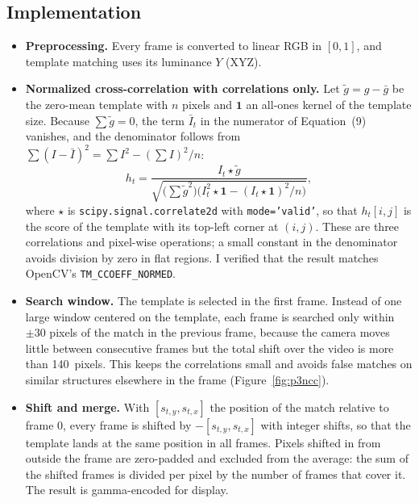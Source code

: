 \documentclass[11pt]{article}
\begin{document}
\subsection*{Implementation}
\begin{itemize}\setlength{\itemsep}{2pt}
\item \textbf{Preprocessing.} Every frame is converted to linear RGB in $[0,1]$, and template matching uses its luminance $Y$ (XYZ).
\item \textbf{Normalized cross-correlation with correlations only.} Let $\tilde g=g-\bar g$ be the zero-mean template with $n$ pixels and $\mathbf 1$ an all-ones kernel of the template size. Because $\sum\tilde g=0$, the term $\bar I_t$ in the numerator of Equation~(9) vanishes, and the denominator follows from $\sum(I-\bar I)^2=\sum I^2-(\sum I)^2/n$:
\begin{equation*}
h_t=\frac{I_t\star\tilde g}{\sqrt{\big(\sum\tilde g^2\big)\big(I_t^2\star\mathbf 1-(I_t\star\mathbf 1)^2/n\big)}},
\end{equation*}
where $\star$ is \texttt{scipy.signal.correlate2d} with \texttt{mode='valid'}, so that $h_t[i,j]$ is the score of the template with its top-left corner at $(i,j)$. These are three correlations and pixel-wise operations; a small constant in the denominator avoids division by zero in flat regions. I verified that the result matches OpenCV's \texttt{TM\_CCOEFF\_NORMED}.
\item \textbf{Search window.} The template is selected in the first frame. Instead of one large window centered on the template, each frame is searched only within $\pm30$ pixels of the match in the previous frame, because the camera moves little between consecutive frames but the total shift over the video is more than 140\ pixels. This keeps the correlations small and avoids false matches on similar structures elsewhere in the frame (Figure~\ref{fig:p3ncc}).
\item \textbf{Shift and merge.} With $[s_{t,y},s_{t,x}]$ the position of the match relative to frame 0, every frame is shifted by $-[s_{t,y},s_{t,x}]$ with integer shifts, so that the template lands at the same position in all frames. Pixels shifted in from outside the frame are zero-padded and excluded from the average: the sum of the shifted frames is divided per pixel by the number of frames that cover it. The result is gamma-encoded for display.
\end{itemize}
\end{document}
